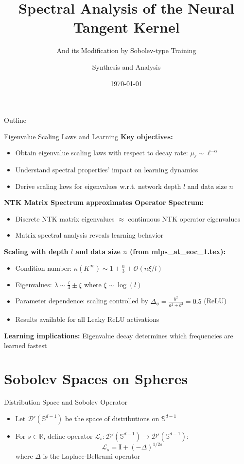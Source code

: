 \documentclass{beamer}
\title{Spectral Analysis of the Neural Tangent Kernel}
\subtitle{And its Modification by Sobolev-type Training}
\author{Synthesis and Analysis}
\date{\today}
\newcommand{\R}{\mathbb{R}}
\newcommand{\I}{\mathbf{I}}
\newcommand{\Sd}{\mathbb{S}^{d-1}}
\newcommand{\Lap}{\Delta}
\newcommand{\Ls}{\mathcal{L}_s}
\begin{document}
\begin{frame}
\titlepage
\end{frame}

\begin{frame}{Outline}
\tableofcontents
\end{frame}

\begin{frame}{Eigenvalue Scaling Laws and Learning}
\textbf{Key objectives:}
\begin{itemize}
\item Obtain eigenvalue scaling laws with respect to decay rate: $\mu_\ell \sim \ell^{-\alpha}$
\item Understand spectral properties' impact on learning dynamics
\item Derive scaling laws for eigenvalues w.r.t. network depth $l$ and data size $n$
\end{itemize}

\textbf{NTK Matrix Spectrum approximates Operator Spectrum:}
\begin{itemize}
\item Discrete NTK matrix eigenvalues $\approx$ continuous NTK operator eigenvalues
\item Matrix spectral analysis reveals learning behavior
\end{itemize}

\textbf{Scaling with depth $l$ and data size $n$ (from mlps\_at\_eoc\_1.tex):}
\begin{itemize}
\item Condition number: $\kappa(K^{\infty}) \sim 1 + \frac{n}{3} + \mathcal{O}(n \xi / l)$
\item Eigenvalues: $\lambda \sim \frac{l}{4} \pm \xi$ where $\xi \sim \log(l)$
\item Parameter dependence: scaling controlled by $\Delta_\phi = \frac{b^2}{a^2+b^2} = 0.5$ (ReLU)
\item Results available for all Leaky ReLU activations
\end{itemize}

\textbf{Learning implications:} Eigenvalue decay determines which frequencies are learned fastest
\end{frame}

\section{Sobolev Spaces on Spheres}

\begin{frame}{Distribution Space and Sobolev Operator}
\begin{itemize}
\item Let $\mathcal{D}'(\Sd)$ be the space of distributions on $\Sd$
\item For $s \in \R$, define operator $\Ls: \mathcal{D}'(\Sd) \to \mathcal{D}'(\Sd)$:
\[ \Ls = \I + (-\Lap)^{1/2s} \]
where $\Lap$ is the Laplace-Beltrami operator
\end{itemize}
\end{frame}
\end{document}

